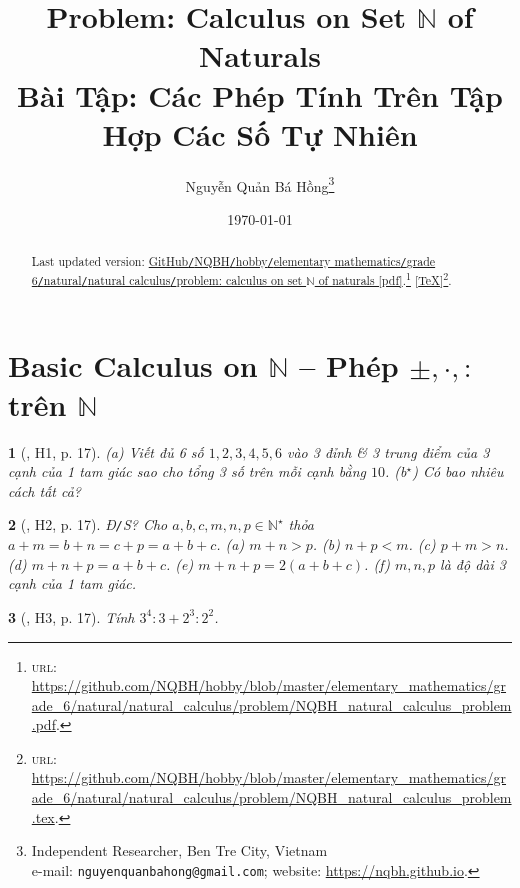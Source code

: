 \documentclass{article}
\title{Problem: Calculus on Set $\mathbb{N}$ of Naturals\\Bài Tập: Các Phép Tính Trên Tập Hợp Các Số Tự Nhiên}
\author{Nguyễn Quản Bá Hồng\footnote{Independent Researcher, Ben Tre City, Vietnam\\e-mail: \texttt{nguyenquanbahong@gmail.com}; website: \url{https://nqbh.github.io}.}}
\date{\today}
\newtheorem{baitoan}{}
\begin{document}
\maketitle
\begin{abstract}
	Last updated version: \href{https://github.com/NQBH/hobby/blob/master/elementary_mathematics/grade_6/natural/natural_calculus/problem/NQBH_natural_calculus_problem.pdf}{GitHub{\tt/}NQBH{\tt/}hobby{\tt/}elementary mathematics{\tt/}grade 6{\tt/}natural{\tt/}natural calculus{\tt/}problem: calculus on set $\mathbb{N}$ of naturals [pdf]}.\footnote{\textsc{url}: \url{https://github.com/NQBH/hobby/blob/master/elementary_mathematics/grade_6/natural/natural_calculus/problem/NQBH_natural_calculus_problem.pdf}.} [\href{https://github.com/NQBH/hobby/blob/master/elementary_mathematics/grade_6/natural/natural_calculus/problem/NQBH_natural_calculus_problem.tex}{\TeX}]\footnote{\textsc{url}: \url{https://github.com/NQBH/hobby/blob/master/elementary_mathematics/grade_6/natural/natural_calculus/problem/NQBH_natural_calculus_problem.tex}.}. 
\end{abstract}
\tableofcontents


\section{Basic Calculus on $\mathbb{N}$ -- Phép $\pm,\cdot,:$ trên $\mathbb{N}$}

\begin{baitoan}[\cite{Binh_boi_duong_Toan_6_tap_1}, H1, p. 17]
	(a) Viết đủ 6 số $1,2,3,4,5,6$ vào 3 đỉnh \& 3 trung điểm của 3 cạnh của 1 tam giác sao cho tổng 3 số trên mỗi cạnh bằng $10$. (b${}^\star$) Có bao nhiêu cách tất cả?
\end{baitoan}

\begin{baitoan}[\cite{Binh_boi_duong_Toan_6_tap_1}, H2, p. 17]
	{\rm Đ{\tt/}S?} Cho $a,b,c,m,n,p\in\mathbb{N}^\star$ thỏa $a + m = b + n = c + p = a + b + c$. (a) $m + n > p$. (b) $n + p < m$. (c) $p + m > n$. (d) $m + n + p = a + b + c$. (e) $m + n + p = 2(a + b + c)$. (f) $m,n,p$ là độ dài 3 cạnh của 1 tam giác.
\end{baitoan}

\begin{baitoan}[\cite{Binh_boi_duong_Toan_6_tap_1}, H3, p. 17]
	Tính $3^4:3 + 2^3:2^2$.
\end{baitoan}
\end{document}
